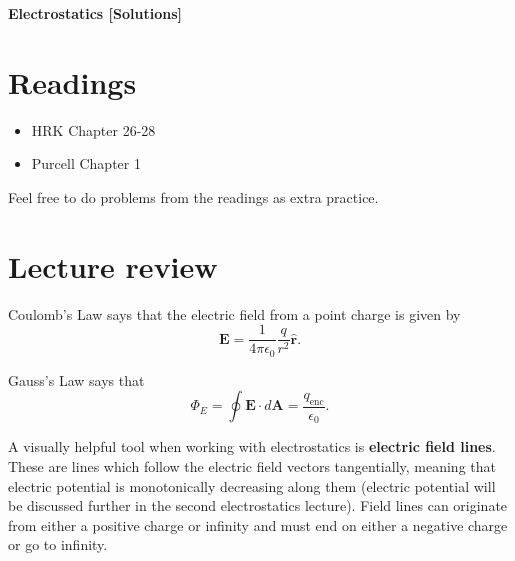 \documentclass[11pt]{scrartcl}
\title{\titlee}
\author{Cambridge Physics Academy}
\date{2023-2024}
\newcommand{\titlee}{Electrostatics [Solutions]}
\begin{document}
\thispagestyle{empty}
\begin{center}
    
    
    \Huge \textbf{\textsf{\titlee}}

    \large \theauthor
\end{center}

\setcounter{section}{-1}
\section{Readings}
\begin{itemize}
    \item HRK Chapter 26-28
    \item Purcell Chapter 1
\end{itemize}
Feel free to do problems from the readings as extra practice.


\section{Lecture review}

\begin{defn}
    Coulomb’s Law says that the electric field from a point charge is given by
    $$\mathbf E = \frac{1}{4\pi\epsilon_0} \frac{q}{r^2}\hat{\mathbf r}.$$
\end{defn}

\begin{defn}
    Gauss's Law says that
    $$\Phi_E = \oint \mathbf E \cdot d\mathbf A = \frac{q_{\text{enc}}}{\epsilon_0}.$$
\end{defn}

\begin{tip}
    A visually helpful tool when working with electrostatics is \textbf{electric field lines}. These are lines which follow the electric field vectors tangentially, meaning that electric potential is monotonically decreasing along them (electric potential will be discussed further in the second electrostatics lecture). Field lines can originate from either a positive charge or infinity and must end on either a negative charge or go to infinity.
\end{tip}
\end{document}

